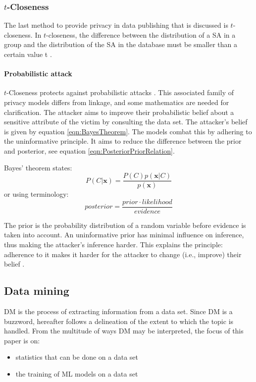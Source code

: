     \subsubsection{$t$-Closeness}
	 The last method to provide privacy in data publishing that is discussed is $t$-closeness. 
	 In $t$-closeness, the difference between the distribution of a \gls{SA} in a group
	 and the distribution of the \gls{SA} in the database must be smaller than a certain value t \cite{Li_2007, Hsu_2014}.

		 \paragraph{Probabilistic attack}
		 $t$-Closeness protects against probabilistic attacks \cite{Fung2010}. 
		 This associated family of privacy models differs from linkage, and some mathematics are needed for clarification.
		 The attacker aims to improve their probabilistic belief about a sensitive attribute of the victim by consulting the data set.
		 The attacker's belief is given by equation \ref{eqn:BayesTheorem}.
		 The models combat this by adhering to the uninformative principle.
		 It aims to reduce the difference between the prior and posterior, see equation \ref{eqn:PosteriorPriorRelation}.

    Bayes' theorem states:
    \begin{equation}
    \label{eqn:BayesTheorem}
        P(C|\mathbf{x}) = \frac{P(C) p(\mathbf{x}|C)}{p(\mathbf{x})}
    \end{equation}
    or using terminology:
    \begin{equation}
    \label{eqn:PosteriorPriorRelation}
        posterior = \frac{prior \cdot likelihood}{evidence}
    \end{equation}

    The prior is the probability distribution of a random variable before evidence is taken into account.
    An uninformative prior has minimal influence on inference, thus making the attacker's inference harder.
    This explains the principle:
    adherence to it makes it harder for the attacker to change (i.e., improve) their belief \cite{Fung2010}.

\subsection{Data mining}
\label{s:DataMining}

\gls{DM} is the process of extracting information from a data set.
Since \gls{DM} is a buzzword, hereafter follows a delineation of the extent to which the topic is handled.
From the multitude of ways \gls{DM} may be interpreted, the focus of this paper is on:
\begin{itemize}
    \item statistics that can be done on a data set
    \item the training of \gls{ML} models on a data set
\end{itemize}

